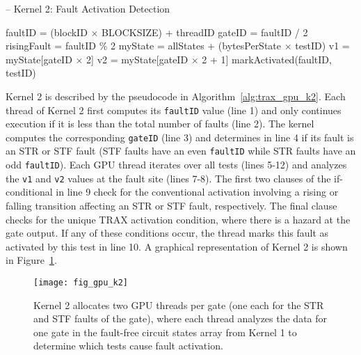 \begin{algorithm}
\centering
\caption[GPU Kernel 2: Fault Activation Detection]{-- Kernel 2: Fault Activation Detection}
\label{alg:trax_gpu_k2}
\begin{algorithmic}[1]
\STATE faultID = (blockID $\times$ BLOCKSIZE) + threadID
  \STATE gateID = faultID / 2
  \STATE risingFault = faultID \% 2
    \STATE myState = allStates + (bytesPerState $\times$ testID)
    \STATE v1 = myState[gateID $\times$ 2]
    \STATE v2 = myState[gateID $\times$ 2 + 1]
      \STATE markActivated(faultID, testID)
    \ENDIF
  \ENDFOR
\ENDIF
\end{algorithmic}
\end{algorithm}

Kernel 2 is described by the pseudocode in Algorithm~\ref{alg:trax_gpu_k2}.
%
Each thread of Kernel 2 first computes its \verb+faultID+ value (line 1) and only continues execution if it is less than the total number of faults (line 2).
%
The kernel computes the corresponding \verb+gateID+ (line 3) and determines in line 4 if its fault is an STR or STF fault (STF faults have an even \verb+faultID+ while STR faults have an odd \verb+faultID+).
%
Each GPU thread iterates over all tests (lines 5-12) and analyzes the \verb+v1+ and \verb+v2+ values at the fault site (lines 7-8).
%
The first two clauses of the if-conditional in line 9 check for the conventional activation involving a rising or falling transition affecting an STR or STF fault, respectively.
%
The final clause checks for the unique TRAX activation condition, where there is a hazard at the gate output.
%
If any of these conditions occur, the thread marks this fault as activated by this test in line 10.
%
A graphical representation of Kernel 2 is shown in Figure~\ref{fig:trax_gpu_k2}.

\begin{figure}[hbtp]
\centering
\texttt{[image: fig\_gpu\_k2]}
\caption{Kernel 2 allocates two GPU threads per gate (one each for the STR and STF faults of the gate), where each thread analyzes the data for one gate in the fault-free circuit states array from Kernel 1 to determine which tests cause fault activation.}
\label{fig:trax_gpu_k2}
\end{figure}


